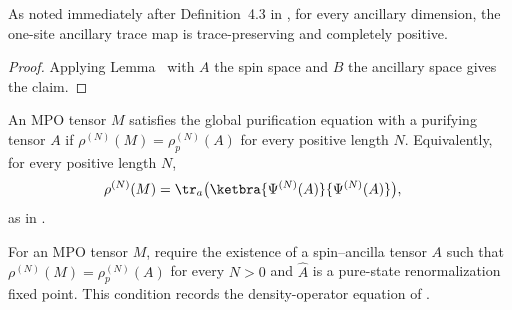 \begin{lemma}
    \label{thm:mpdo_ancillary_trace_map_is_kraus_cptp}
    \leanok
    As noted immediately after Definition~4.3 in
    \cite[lines~761--764]{Cirac2016MPDO_arXiv}, for every ancillary dimension,
    the one-site ancillary trace map is trace-preserving and completely
    positive.
\end{lemma}
\begin{proof}
    \leanok

    Applying Lemma~\cite[``The right partial trace is trace-preserving completely positive'']{QICLean2026Blueprint}
    with $A$ the spin space and $B$ the ancillary space gives the claim.
\end{proof}

\begin{definition}
    \label{def:mpdo_global_purification_equation}
    \leanok
    An MPO tensor $M$ satisfies the global purification equation with a
    purifying tensor $A$ if
    $\rho^{(N)}(M)=\rho^{(N)}_p(A)$ for every positive length $N$.
    Equivalently, for every positive length $N$,
    \begin{align}
        \rho^{(N)}(M)
         & =
        \tr_a
        \bigl(        \ketbra{\Psi^{(N)}(A)}{\Psi^{(N)}(A)}
        \bigr),
        \notag
    \end{align}
    as in \cite[line~751]{Cirac2016MPDO_arXiv}.
\end{definition}

\begin{definition}
    \label{def:mpdo_purification_rfp_witness}
    \leanok
    For an MPO tensor $M$, require the existence of a spin--ancilla tensor $A$
    such that $\rho^{(N)}(M)=\rho^{(N)}_p(A)$ for every $N>0$ and
    $\widehat A$ is a pure-state renormalization fixed point.
    This condition records the density-operator equation of
    \cite[line~751]{Cirac2016MPDO_arXiv}.
\end{definition}

